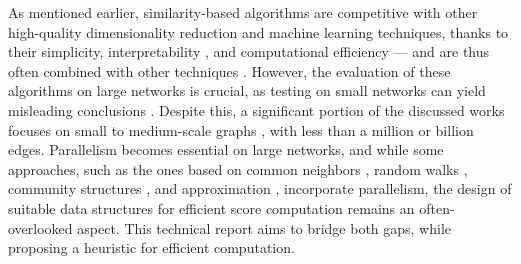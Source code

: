 As mentioned earlier, similarity-based algorithms are competitive with other high-quality dimensionality reduction and machine learning techniques, thanks to their simplicity, interpretability \cite{pai2019netdx, barbieri2014follow}, and computational efficiency \cite{garcia2014link} --- and are thus often combined with other techniques \cite{kumari2022supervised, abuoda2020link, pai2019netdx}. However, the evaluation of these algorithms on large networks is crucial, as testing on small networks can yield misleading conclusions \cite{zhou2021progresses, zhou2021experimental}. Despite this, a significant portion of the discussed works focuses on small \cite{guo2019node, rafiee2020cndp, mumin2022efficient, papadimitriou2012fast, vega2021link, saifi2023fast, ferreira2019scalability, benhidour2022approach, wang2023resisting, wang2023meta, wang2023tdan} to medium-scale graphs \cite{yang2015new, cui2016bounded, kalkanfinding, mohan2017scalable, wang2019link, bastami2019gravitation, shin2012multi, garcia2014link}, with less than a million or billion edges. Parallelism becomes essential on large networks, and while some approaches, such as the ones based on common neighbors \cite{yang2015new, cui2016bounded}, random walks \cite{papadimitriou2012fast}, community structures \cite{mohan2017scalable, wang2019link}, and approximation \cite{garcia2014link}, incorporate parallelism, the design of suitable data structures for efficient score computation remains an often-overlooked aspect. This technical report aims to bridge both gaps, while proposing a heuristic for efficient computation.
